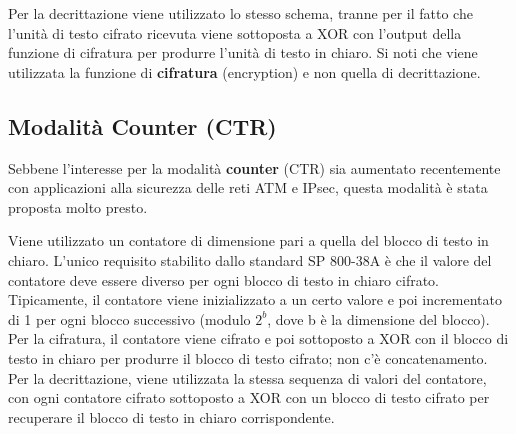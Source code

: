 \documentclass{article}
\begin{document}
Per la decrittazione viene utilizzato lo stesso schema, tranne per il fatto che l'unità di testo cifrato ricevuta viene sottoposta a XOR con l'output della funzione di cifratura per produrre l'unità di testo in chiaro. Si noti che viene utilizzata la funzione di \textbf{cifratura} (encryption) e non quella di decrittazione.

\subsection*{Modalità Counter (CTR)}

Sebbene l'interesse per la modalità \textbf{counter} (CTR) sia aumentato recentemente con applicazioni alla sicurezza delle reti ATM e IPsec, questa modalità è stata proposta molto presto.

Viene utilizzato un contatore di dimensione pari a quella del blocco di testo in chiaro. L'unico requisito stabilito dallo standard SP 800-38A è che il valore del contatore deve essere diverso per ogni blocco di testo in chiaro cifrato. Tipicamente, il contatore viene inizializzato a un certo valore e poi incrementato di 1 per ogni blocco successivo (modulo $2^b$, dove b è la dimensione del blocco). Per la cifratura, il contatore viene cifrato e poi sottoposto a XOR con il blocco di testo in chiaro per produrre il blocco di testo cifrato; non c'è concatenamento. Per la decrittazione, viene utilizzata la stessa sequenza di valori del contatore, con ogni contatore cifrato sottoposto a XOR con un blocco di testo cifrato per recuperare il blocco di testo in chiaro corrispondente.
\end{document}

